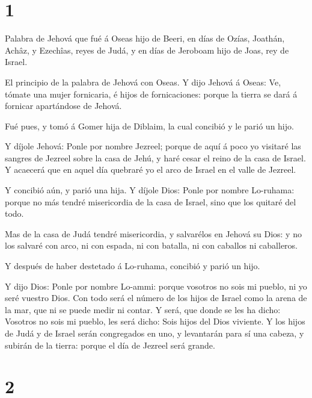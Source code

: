 \hypertarget{section}{%
\section{1}\label{section}}

 Palabra de Jehová que fué á Oseas hijo de Beeri, en días de
Ozías, Joathán, Achâz, y Ezechîas, reyes de Judá, y en días de Jeroboam
hijo de Joas, rey de Israel.

 El principio de la palabra de Jehová con Oseas. Y dijo
Jehová á Oseas: Ve, tómate una mujer fornicaria, é hijos de
fornicaciones: porque la tierra se dará á fornicar apartándose de
Jehová.

 Fué pues, y tomó á Gomer hija de Diblaim, la cual concibió
y le parió un hijo.

 Y díjole Jehová: Ponle por nombre Jezreel; porque de aquí á
poco yo visitaré las sangres de Jezreel sobre la casa de Jehú, y haré
cesar el reino de la casa de Israel.  Y acaecerá que en
aquel día quebraré yo el arco de Israel en el valle de Jezreel.

 Y concibió aún, y parió una hija. Y díjole Dios: Ponle por
nombre Lo-ruhama: porque no más tendré misericordia de la casa de
Israel, sino que los quitaré del todo.

 Mas de la casa de Judá tendré misericordia, y salvarélos en
Jehová su Dios: y no los salvaré con arco, ni con espada, ni con
batalla, ni con caballos ni caballeros.

 Y después de haber destetado á Lo-ruhama, concibió y parió
un hijo.

 Y dijo Dios: Ponle por nombre Lo-ammi: porque vosotros no
sois mi pueblo, ni yo seré vuestro Dios.  Con todo será el
número de los hijos de Israel como la arena de la mar, que ni se puede
medir ni contar. Y será, que donde se les ha dicho: Vosotros no sois mi
pueblo, les será dicho: Sois hijos del Dios viviente.  Y
los hijos de Judá y de Israel serán congregados en uno, y levantarán
para sí una cabeza, y subirán de la tierra: porque el día de Jezreel
será grande.

\hypertarget{section-1}{%
\section{2}\label{section-1}}

